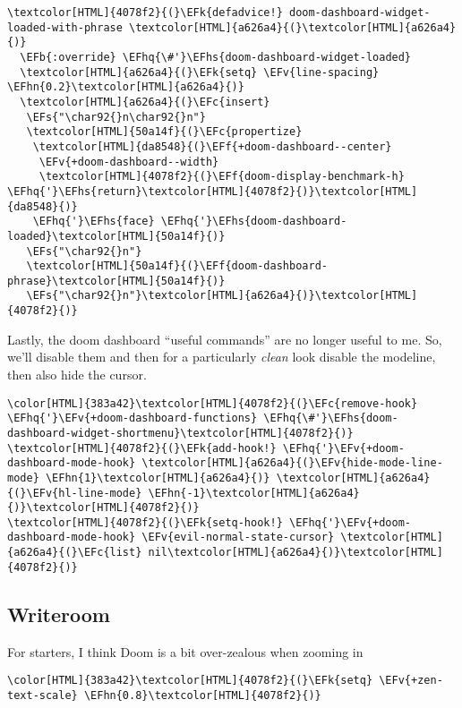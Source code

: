 \documentclass{scrartcl}
\newcommand{\EFk}[1]{\textcolor{EFk}{#1}} %
\newcommand{\EFs}[1]{\textcolor{EFs}{#1}} %
\newcommand{\EFb}[1]{\textcolor{EFb}{#1}} %
\newcommand{\EFc}[1]{\textcolor{EFc}{#1}} %
\newcommand{\EFv}[1]{\textcolor{EFv}{#1}} %
\newcommand{\EFf}[1]{\textcolor{EFf}{#1}} %
\newcommand{\EFhn}[1]{\textcolor{EFhn}{\textbf{#1}}} %
\newcommand{\EFhq}[1]{\textcolor{EFhq}{#1}} %
\newcommand{\EFhs}[1]{\textcolor{EFhs}{#1}} %
\begin{document}
\begin{Code}
\begin{Verbatim}[]
\textcolor[HTML]{4078f2}{(}\EFk{defadvice!} doom-dashboard-widget-loaded-with-phrase \textcolor[HTML]{a626a4}{(}\textcolor[HTML]{a626a4}{)}
  \EFb{:override} \EFhq{\#'}\EFhs{doom-dashboard-widget-loaded}
  \textcolor[HTML]{a626a4}{(}\EFk{setq} \EFv{line-spacing} \EFhn{0.2}\textcolor[HTML]{a626a4}{)}
  \textcolor[HTML]{a626a4}{(}\EFc{insert}
   \EFs{"\char92{}n\char92{}n"}
   \textcolor[HTML]{50a14f}{(}\EFc{propertize}
    \textcolor[HTML]{da8548}{(}\EFf{+doom-dashboard--center}
     \EFv{+doom-dashboard--width}
     \textcolor[HTML]{4078f2}{(}\EFf{doom-display-benchmark-h} \EFhq{'}\EFhs{return}\textcolor[HTML]{4078f2}{)}\textcolor[HTML]{da8548}{)}
    \EFhq{'}\EFhs{face} \EFhq{'}\EFhs{doom-dashboard-loaded}\textcolor[HTML]{50a14f}{)}
   \EFs{"\char92{}n"}
   \textcolor[HTML]{50a14f}{(}\EFf{doom-dashboard-phrase}\textcolor[HTML]{50a14f}{)}
   \EFs{"\char92{}n"}\textcolor[HTML]{a626a4}{)}\textcolor[HTML]{4078f2}{)}
\end{Verbatim}
\end{Code}

Lastly, the doom dashboard ``useful commands'' are no longer useful to me. So, we'll disable them and then for a particularly \emph{clean} look disable the modeline, then also hide the cursor.
\begin{Code}
\begin{Verbatim}[]
\color[HTML]{383a42}\textcolor[HTML]{4078f2}{(}\EFc{remove-hook} \EFhq{'}\EFv{+doom-dashboard-functions} \EFhq{\#'}\EFhs{doom-dashboard-widget-shortmenu}\textcolor[HTML]{4078f2}{)}
\textcolor[HTML]{4078f2}{(}\EFk{add-hook!} \EFhq{'}\EFv{+doom-dashboard-mode-hook} \textcolor[HTML]{a626a4}{(}\EFv{hide-mode-line-mode} \EFhn{1}\textcolor[HTML]{a626a4}{)} \textcolor[HTML]{a626a4}{(}\EFv{hl-line-mode} \EFhn{-1}\textcolor[HTML]{a626a4}{)}\textcolor[HTML]{4078f2}{)}
\textcolor[HTML]{4078f2}{(}\EFk{setq-hook!} \EFhq{'}\EFv{+doom-dashboard-mode-hook} \EFv{evil-normal-state-cursor} \textcolor[HTML]{a626a4}{(}\EFc{list} nil\textcolor[HTML]{a626a4}{)}\textcolor[HTML]{4078f2}{)}
\end{Verbatim}
\end{Code}

\subsection{Writeroom}
\label{sec:orgc841e85}
For starters, I think Doom is a bit over-zealous when zooming in
\begin{Code}
\begin{Verbatim}[]
\color[HTML]{383a42}\textcolor[HTML]{4078f2}{(}\EFk{setq} \EFv{+zen-text-scale} \EFhn{0.8}\textcolor[HTML]{4078f2}{)}
\end{Verbatim}
\end{Code}
\end{document}
